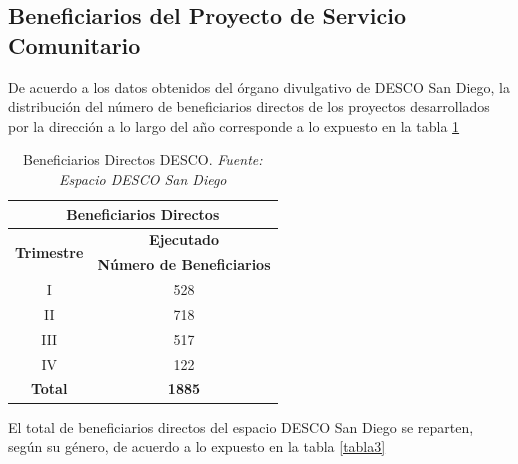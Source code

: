 \documentclass[11pt, a4paper, twosides]{report}
\begin{document}
\subsection{Beneficiarios del Proyecto de Servicio Comunitario}
De acuerdo a los datos obtenidos del órgano divulgativo de DESCO San Diego, la distribución del número de beneficiarios directos de los proyectos desarrollados por la dirección a lo largo del año corresponde a lo expuesto en la tabla \ref{tabla2}

\begin{table}[h]
	\centering
	\begin{tabular}{|c|c|}
		\hline
		\multicolumn{2}{|c|}{\cellcolor{gray75} \textbf{Beneficiarios Directos}}                  \\ \hline
		\multirow{2}{*}{\textbf{Trimestre}} & \textbf{Ejecutado}               \\ \cline{2-2} 
		& \textbf{Número de Beneficiarios} \\ \hline
		I                                   & 528                              \\ \hline
		II                                  & 718                              \\ \hline
		III                                 & 517                              \\ \hline
		IV                                  & 122                              \\ \hline
		\textbf{Total}                      & \textbf{1885}                    \\ \hline
	\end{tabular}
		\caption{Beneficiarios Directos DESCO. \textit{Fuente: Espacio DESCO San Diego}}
		\label{tabla2}
\end{table}
El total de beneficiarios directos del espacio DESCO San Diego se reparten, según su género, de acuerdo a lo expuesto en la tabla \ref{tabla3}
\end{document}
